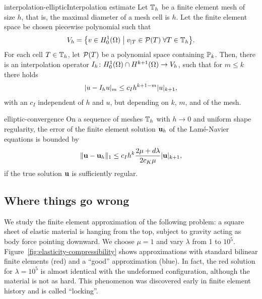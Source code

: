 \begin{Theorem*}{interpolation-elliptic}{Interpolation estimate}
  Let $\mesh_h$ be a finite element mesh of size $h$, that is, the
  maximal diameter of a mesh cell is $h$. Let the finite element space
  be chosen piecewise polynomial such that
  \begin{gather}
    V_h = \bigl\{ v \in H^1_0(\domain) \;\big|\;
    v_{|\cell} \in \mathcal P(\cell) \;\forall \cell\in\mesh_h \bigr\}.
  \end{gather}
  For each cell $\cell\in\mesh_h$, let $\mathcal P(\cell)$ be a
  polynomial space containing $\P_k$. Then, there is an interpolation
  operator $I_h\colon H^1_0(\domain)\cap H^{k+1}(\domain)\to V_h$,
  such that for $m\le k$ there holds
  \begin{gather}
    \abs{u-I_h u}_{m} \le c_I h^{k+1-m}\abs{u}_{k+1},
  \end{gather}
  with an  $c_I$ independent of $h$ and
  $u$, but depending on $k$, $m$, and  of the mesh.
\end{Theorem*}

\begin{Theorem}{elliptic-convergence}
  On a sequence of meshes $\mesh_h$ with $h\to 0$ and uniform shape
  regularity, the error of the finite element solution $\vu_h$ of the
  Lamé-Navier equations is bounded by
  \begin{gather}
    \norm{\vu-\vu_h}_{1} \le c_I h^k \frac{2\mu+d\lambda}{2c_K\mu}
    \abs{\vu}_{k+1},
  \end{gather}
  if the true solution $\vu$ is sufficiently regular.
\end{Theorem}

\subsection{Where things go wrong}
\begin{example}
  We study the finite element approximation of the following problem:
  a square sheet of elastic material is hanging from the top, subject
  to gravity acting as body force pointing downward. We choose $\mu=1$
  and vary $\lambda$ from 1 to
  $10^5$. Figure~\ref{fig:elasticity-compressibility} shows
  approximations with standard bilinear finite elements (red) and a
  ``good'' approximation (blue). In fact, the red solution for
  $\lambda = 10^5$ is almost identical with the undeformed
  configuration, although the material is not as hard. This phenomenon
  was discovered early in finite element history and is called
  ``locking''.
\end{example}

